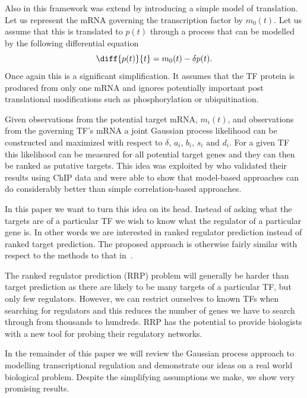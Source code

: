 \documentclass{article}
\begin{document}
Also in \cite{Gao:latent08} this framework was extend by introducing a
simple model  of translation.  Let us represent the  mRNA governing the
transcription factor by $m_0(t)$. Let us assume that this is translated
to  $p(t)$ through a  process that  can be  modelled by  the following
differential equation
\begin{equation}
  \diff{p(t)}{t} = m_0(t) - \delta p(t).
\end{equation}
Once again this  is a significant simplification. It  assumes that the
TF  protein is  produced from  only one  mRNA and  ignores potentially
important post translational  modifications such as phosphorylation or
ubiquitination.

Given  observations  from the  potential  target  mRNA, $m_i(t)$,  and
observations  from the  governing TF's  mRNA a  joint  Gaussian process
likelihood can be constructed  and maximized with respect to $\delta$,
$a_i$,  $b_i$,  $s_i$  and  $d_i$.  For  a  given  TF  this
likelihood can be measured for all potential target genes and they can
then  be ranked  as  putative  targets.  This  idea  was exploited  by
\cite{Honkela:modelbased10}  who validated  their  results using  ChIP
data  and  were  able to  show  that  model-based approaches  can  do
considerably better than simple correlation-based approaches.

In this paper we want to turn this idea on its head. Instead of asking
what  the targets are  of a  particular TF  we wish  to know  what the
regulator of a particular gene is. In other words we are interested in
ranked regulator prediction instead  of ranked target prediction.
The proposed approach is otherwise fairly similar with respect to the
methods to that in~\cite{Honkela:modelbased10}.

The ranked regulator prediction (RRP)
problem will generally  be harder than target prediction  as there are
likely to be many targets of a particular TF, but only few regulators.
However, we  can restrict  ourselves to known  TFs when  searching for
regulators  and this reduces  the number  of genes  we have  to search
through from thousands to hundreds.  RRP
has the  potential to provide biologists  with a new  tool for probing
their regulatory networks.

In the  remainder of  this paper we  will review the  Gaussian process
approach to  modelling transcriptional regulation  and demonstrate our
ideas  on a  real world  biological problem.  Despite  the simplifying
assumptions we make, we show very promising results.
\end{document}
